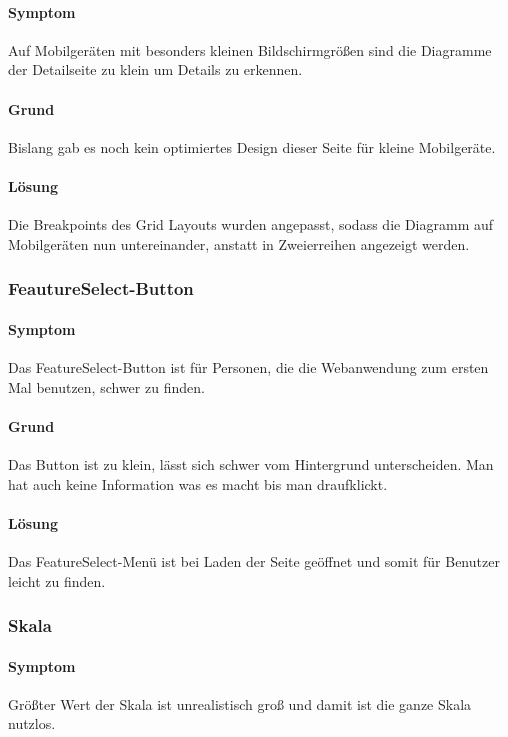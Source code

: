      \paragraph{Symptom}
        Auf Mobilgeräten mit besonders kleinen Bildschirmgrößen sind die Diagramme der Detailseite zu klein um Details zu erkennen.

      \paragraph{Grund}
      Bislang gab es noch kein optimiertes Design dieser Seite für kleine Mobilgeräte.

      \paragraph{Lösung}
      Die Breakpoints des Grid Layouts wurden angepasst, sodass die Diagramm auf Mobilgeräten nun untereinander, anstatt in Zweierreihen angezeigt werden.

    \subsubsection*{FeautureSelect-Button}
      \paragraph{Symptom}
      Das FeatureSelect-Button ist für Personen, die die Webanwendung zum ersten Mal benutzen, schwer zu finden.  

      \paragraph{Grund}
      Das Button ist zu klein, lässt sich schwer vom Hintergrund unterscheiden. Man hat auch keine Information was es macht bis man draufklickt.

      \paragraph{Lösung}
      Das FeatureSelect-Menü ist bei Laden der Seite geöffnet und somit für Benutzer leicht zu finden.

    \subsubsection*{Skala}
      \paragraph{Symptom}
      Größter Wert der Skala ist unrealistisch groß und damit ist die ganze Skala nutzlos.

